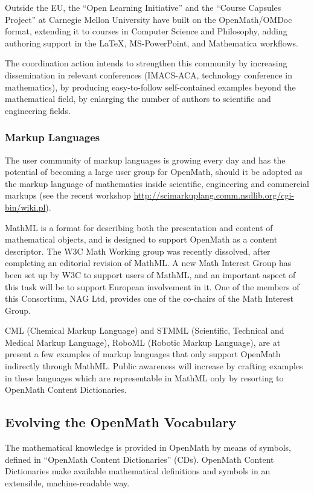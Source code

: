 \documentclass{euproposal}
\begin{document}
  Outside the EU, the ``Open Learning Initiative'' and the ``Course Capsules
  Project'' at Carnegie Mellon University have built on the OpenMath/OMDoc format,
  extending it to courses in Computer Science and Philosophy, adding authoring
  support in the {\LaTeX}, MS-PowerPoint, and Mathematica workflows.

The coordination action intends to strengthen this community by
increasing dissemination in relevant conferences (IMACS-ACA,
technology conference in mathematics), by producing easy-to-follow
self-contained examples beyond the mathematical field, by enlarging
the number of authors to scientific and engineering fields.

\subsubsection{Markup Languages}\label{sec:ml}

The user community of markup languages is growing every day and has
the potential of becoming a large user group for OpenMath, should it
be adopted as the markup language of mathematics inside scientific,
engineering and commercial markups (see the recent workshop
\url{http://scimarkuplang.comm.nsdlib.org/cgi-bin/wiki.pl}).

MathML is a format for describing both the presentation and content of
mathematical objects, and is designed to support OpenMath as a content
descriptor.  The W3C Math Working group was recently dissolved, after
completing an editorial revision of MathML.  A new Math Interest Group
has been set up by W3C to support users of MathML, and an important
aspect of this task will be to support European involvement in it.
One of the members of this Consortium, NAG Ltd, provides one of the
co-chairs of the Math Interest Group.

CML (Chemical Markup Language) and STMML (Scientific, Technical and
Medical Markup Language), RoboML (Robotic Markup Language), are at
present a few examples of markup languages that only support OpenMath
indirectly through MathML.  Public awareness will increase by crafting
examples in these languages which are representable in MathML only by
resorting to OpenMath Content Dictionaries.

\subsection{Evolving the OpenMath Vocabulary}\label{sec:OCD}

The mathematical knowledge is provided in OpenMath by means of
symbols, defined in ``OpenMath Content Dictionaries'' (CDs).  OpenMath
Content Dictionaries make available mathematical definitions and
symbols in an extensible, machine-readable way.
\end{document}
